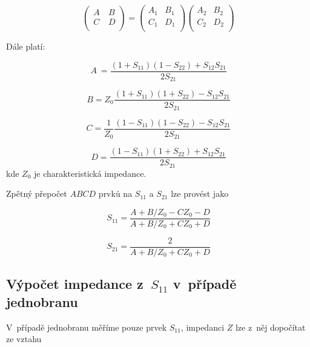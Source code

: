 \documentclass{protokol}
\newcommand\sparam{S}
\newcommand\impedance{Z}
\begin{document}
\[
\begin{pmatrix}
	A~& B  \\
	C &	D  \\
\end{pmatrix}
=
\begin{pmatrix}
	A_1 & B_1  \\
	C_1 & D_1  \\
\end{pmatrix}
%
\begin{pmatrix}
	A_2 & B_2  \\
	C_2 & D_2  \\
\end{pmatrix}
\]

Dále platí:

\begin{equation}
	A~= \frac{(1+S_{11})(1-S_{22})+S_{12}S_{21}}{2S_{21}}
	\label{eq:A}
\end{equation}

\begin{equation}
	B = Z_0 \frac{(1+S_{11})(1+S_{22})-S_{12}S_{21}}{2S_{21}}
	\label{eq:B}
\end{equation}

\begin{equation}
	C = \frac{1}{Z_0} \frac{(1-S_{11})(1-S_{22})-S_{12}S_{21}}{2S_{21}}
	\label{eq:C}
\end{equation}

\begin{equation}
	D = \frac{(1-S_{11})(1+S_{22})+S_{12}S_{21}}{2S_{21}}
	\label{eq:D}
\end{equation}
kde $\impedance_{0}$ je charakteristická impedance.

Zpětný přepočet $ABCD$ prvků na $S_{11}$ a $S_{21}$ lze provést jako

\begin{equation}
	S_{11} = \frac{A+B/Z_0-CZ_0-D}{A+B/Z_0+CZ_0+D}
	\label{eq:s11}
\end{equation}

\begin{equation}
	S_{21} = \frac{2}{A+B/Z_0+CZ_0+D}
	\label{eq:s21}
\end{equation}

\subsection{Výpočet impedance z~$\sparam_{11}$ v~případě jednobranu}
V~případě jednobranu měříme pouze prvek $\sparam_{11}$, impedanci $\impedance$
lze z~něj dopočítat ze vztahu
\end{document}
